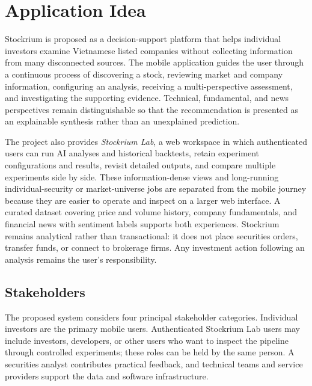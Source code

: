 \section{Application Idea}
\label{sec:application-idea}

Stockrium is proposed as a decision-support platform that helps individual investors examine Vietnamese listed companies without collecting information from many disconnected sources. The mobile application guides the user through a continuous process of discovering a stock, reviewing market and company information, configuring an analysis, receiving a multi-perspective assessment, and investigating the supporting evidence. Technical, fundamental, and news perspectives remain distinguishable so that the recommendation is presented as an explainable synthesis rather than an unexplained prediction.

The project also provides \textit{Stockrium Lab}, a web workspace in which authenticated users can run AI analyses and historical backtests, retain experiment configurations and results, revisit detailed outputs, and compare multiple experiments side by side. These information-dense views and long-running individual-security or market-universe jobs are separated from the mobile journey because they are easier to operate and inspect on a larger web interface. A curated dataset covering price and volume history, company fundamentals, and financial news with sentiment labels supports both experiences. Stockrium remains analytical rather than transactional: it does not place securities orders, transfer funds, or connect to brokerage firms. Any investment action following an analysis remains the user's responsibility.

\subsection{Stakeholders}
\label{subsec:application-stakeholders}

The proposed system considers four principal stakeholder categories. Individual investors are the primary mobile users. Authenticated Stockrium Lab users may include investors, developers, or other users who want to inspect the pipeline through controlled experiments; these roles can be held by the same person. A securities analyst contributes practical feedback, and technical teams and service providers support the data and software infrastructure.

